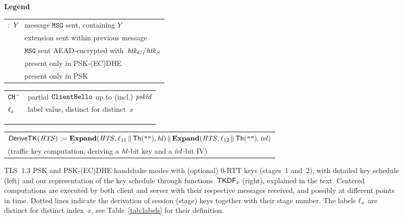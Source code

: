 \begin{figure}[tp]
	\centering
	
	
	
	\begin{minipage}{0.95\textwidth}
	\vspace{0.25cm}
	\scriptsize
	\textbf{Legend} \\
	\begin{tabular}{ll}
		\TLSmsg{$\mathtt{MSG}$}:~$Y$	& message $\mathtt{MSG}$ sent, containing $Y$ \\
		\TLSmsg{+~$\mathtt{MSG}$}	& extension sent within previous message \\
		\TLSmsg{$\{\mathtt{MSG}\}$}	& $\mathtt{MSG}$ sent AEAD-encrypted with~$\mathit{htk}_C$/$\mathit{htk}_S$ \\
		\PSKECDHEonly{\dots}		& present only in PSK-(EC)DHE \\
		\PSKonly{\dots}			& present only in PSK \\
	\end{tabular}
	\begin{tabular}{ll}
		$\mathtt{CH}^{-}$			& partial $\mathtt{ClientHello}$ up to (incl.) $\mathit{pskid}$ \\
		$\ell_{x}$		& label value, distinct for distinct~$x$ \\
		&\\
		&\\
		&\\
	\end{tabular}
	\begin{tabular}{l}
		$\mathsf{DeriveTK}(\mathit{HTS}) := \mathbf{Expand}(\mathit{HTS}, \ell_{11} {\,\|\,} \mathsf{Th}(\texttt{""}), \mathit{hl}) {\,\|\,} \mathbf{Expand}(\mathit{HTS}, \ell_{12} {\,\|\,} \mathsf{Th}(\texttt{""}), \mathit{ivl})$\\
		\quad(traffic key computation, deriving a $\mathit{hl}$-bit key and a $\mathit{ivl}$-bit IV)
	\end{tabular}
	\end{minipage}
	
	\caption{%
		TLS~1.3 PSK and PSK-(EC)DHE handshake modes with (optional) 0-RTT keys (stages~1 and~2),
		with detailed key schedule (left) and our representation of the key schedule through functions~$\mathsf{TKDF}_{x}$ (right), explained in the text.
		Centered computations are executed by both client and server with their respective messages received, and possibly at different points in time.
		Dotted lines indicate the derivation of session (stage) keys together with their stage number.
		The labels $\ell_{x}$ are distinct for distinct index~$x$, see
				Table~\ref{tab:labels}
		for their definition.
	}
	\label{fig:tls-handshake}
\end{figure}

